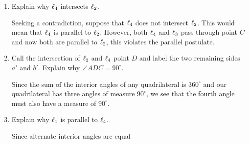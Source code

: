 \documentclass[newpage,hints,handout,noauthor,nooutcomes,12pt]{ximera}
\begin{document}
\begin{problem}
\begin{enumerate}
\begin{freeResponse}
\begin{image}
\end{image}
we see that $\l_3$ is parallel to $\l_2$. 
\end{freeResponse}


\item Explain why $\ell_4$ intersects $\l_2$.

\begin{freeResponse}
  Seeking a contradiction, suppose that $\ell_4$ does not intersect
  $\l_2$. This would mean that $\ell_4$ is parallel to $\l_2$. However,
  both $\ell_4$ and $\l_3$ pass through point $C$ and now both are
  parallel to $\l_2$, this violates the parallel postulate.
\end{freeResponse}


\item Call the intersection of $\l_2$ and $\ell_4$ point $D$ and label the two
remaining sides $a'$ and $b'$. Explain why $\angle ADC = 90^\circ$.

\begin{freeResponse}
Since the sum of the interior angles of any quadrilateral is
$360^\circ$ and our quadrilateral has three angles of measure
$90^\circ$, we see that the fourth angle must also have a measure of
$90^\circ$.
\end{freeResponse}



\item Explain why $\ell_1$ is parallel to $\ell_4$.

\begin{freeResponse}
Since alternate interior angles are equal
\begin{image}
\end{image}
\end{freeResponse}
\end{enumerate}
\end{problem}
\end{document}
